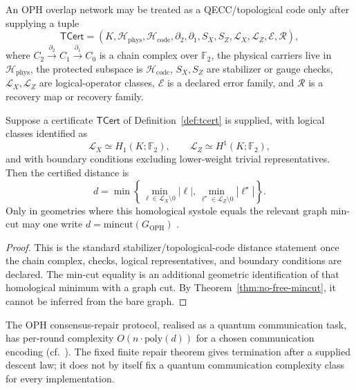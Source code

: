 \begin{definition}\label{def:tcert}
An OPH overlap network may be treated as a QECC/topological code only after supplying a tuple
\[
\mathsf{TCert}=
(K,\mathcal H_{\mathrm{phys}},\mathcal H_{\mathrm{code}},
\partial_2,\partial_1,S_X,S_Z,\mathcal L_X,\mathcal L_Z,\mathcal E,\mathcal R),
\]
where \(C_2\xrightarrow{\partial_2}C_1\xrightarrow{\partial_1}C_0\) is a chain complex over
\(\mathbb F_2\), the physical carriers live in \(\mathcal H_{\mathrm{phys}}\), the protected
subspace is \(\mathcal H_{\mathrm{code}}\), \(S_X,S_Z\) are stabilizer or gauge checks,
\(\mathcal L_X,\mathcal L_Z\) are logical-operator classes, \(\mathcal E\) is a declared error
family, and \(\mathcal R\) is a recovery map or recovery family.
\end{definition}

\begin{theorem}
\label{thm:tcert-distance}
Suppose a certificate \(\mathsf{TCert}\) of Definition~\ref{def:tcert} is supplied, with logical
classes identified as
\[
\mathcal L_X\simeq H_1(K;\mathbb F_2),
\qquad
\mathcal L_Z\simeq H^1(K;\mathbb F_2),
\]
and with boundary conditions excluding lower-weight trivial representatives. Then the certified
distance is
\[
d=
\min\left\{
\min_{\ell\in\mathcal L_X\setminus0}|\ell|,
\min_{\ell^\star\in\mathcal L_Z\setminus0}|\ell^\star|
\right\}.
\]
Only in geometries where this homological systole equals the relevant graph min-cut may one write
\(d=\mathrm{mincut}(G_{\mathrm{OPH}})\) \cite{Kitaev2003,Dennis2002}.
\end{theorem}

\begin{proof}
This is the standard stabilizer/topological-code distance statement once the chain complex,
checks, logical representatives, and boundary conditions are declared. The min-cut equality is an
additional geometric identification of that homological minimum with a graph cut. By
Theorem~\ref{thm:no-free-mincut}, it cannot be inferred from the bare graph.
\end{proof}

\begin{conjecture}
\label{conj:comm-complexity}
The \textrm{OPH} consensus-repair protocol, realised as a quantum
communication task, has per-round complexity $O(n\cdot\mathrm{poly}(d))$
for a chosen communication encoding (cf.~\cite{BCW98}). The fixed finite repair theorem gives
termination after a supplied descent law; it does not by itself fix a quantum communication
complexity class for every implementation.
\end{conjecture}

